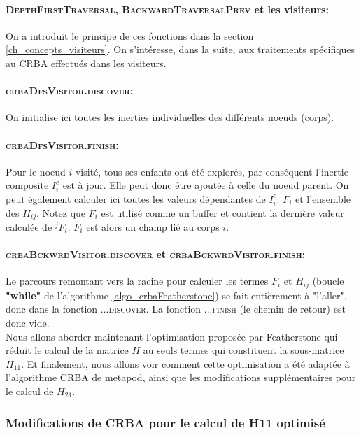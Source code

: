 \documentclass{report}
\begin{document}
\paragraph{\textsc{DepthFirstTraversal}, \textsc{BackwardTraversalPrev} et les visiteurs:}
On a introduit le principe de ces fonctions dans la section \ref{ch_concepts_visiteurs}. On s'intéresse, dans la suite, aux traitements spécifiques au CRBA  effectués dans les visiteurs.

\paragraph{\textsc{crbaDfsVisitor.discover}:}
On initialise ici toutes les inerties individuelles des différents noeuds (corps).

\paragraph{\textsc{crbaDfsVisitor.finish}:}
Pour le noeud $i$ visité, tous ses enfants ont été explorés, par conséquent l'inertie composite $I_i^c$ est à jour. Elle peut donc être ajoutée à celle du noeud parent. On peut également calculer ici toutes les valeurs dépendantes de $I_i^c$: $F_i$ et l'ensemble des $H_{ij}$. Notez que $F_i$ est utilisé comme un buffer et contient la dernière valeur calculée de $^jF_i$. $F_i$ est alors un champ lié au corps $i$.

\paragraph{\textsc{crbaBckwrdVisitor.discover} et \textsc{crbaBckwrdVisitor.finish}:}
Le parcours remontant vers la racine pour calculer les termes $F_i$ et $H_{ij}$ (boucle \textbf{"while"} de l'algorithme \ref{algo_crbaFeatherstone}) se fait entièrement à "l'aller", donc dans la fonction \textsc{...discover}. La fonction \textsc{...finish} (le chemin de retour) est donc vide. \\


Nous allons aborder maintenant l'optimisation proposée par Featherstone qui réduit le calcul de la matrice $H$ au seuls termes qui constituent la sous-matrice $H_{11}$. Et finalement, nous allons voir comment cette optimisation a été adaptée à l'algorithme CRBA de metapod, ainsi que les modifications supplémentaires pour le calcul de $H_{21}$.


\subsubsection{Modifications de CRBA pour le calcul de H11 optimisé}
\end{document}
